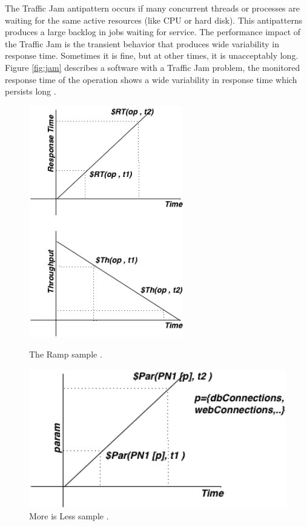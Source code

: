 \documentclass{report}
\begin{document}
The Traffic Jam antipattern occurs if many concurrent threads or processes are waiting for the same  active resources (like CPU or hard disk). This antipatterns produces a large backlog in jobs waiting for service. The performance impact of the Traffic Jam is the transient behavior that produces wide variability in response time. Sometimes it is fine, but at other times, it is unacceptably long. Figure \ref{fig:jam} describes a software with a Traffic Jam problem, the monitored response time of the operation shows a wide variability in response time which persists long \cite{Vetoio2011}.


\begin{figure}[!h]
\begin{minipage}{.5\textwidth}
\centering
\includegraphics[width=0.6\textwidth]{./images/ramp.png}
\caption{The Ramp sample \cite{Vetoio2011}.}
\label{fig:ramp}
\end{minipage}
\begin{minipage}{.5\textwidth}
\centering
\includegraphics[width=1\textwidth]{./images/moreisless.png}
\caption{More is Less sample \cite{Vetoio2011}.}
\label{fig:moreisless}
\end{minipage}
\end{figure}
\end{document}
